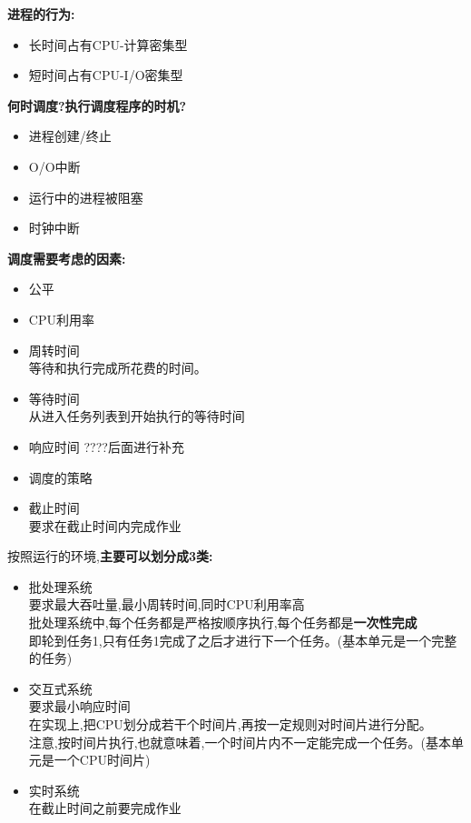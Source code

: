 \documentclass[UTF8,a4paper]{ctexart}
\newcommand{\spaceline}{\vspace{\baselineskip}}
\begin{document}
    \spaceline
    \textbf{进程的行为:}
    \begin{itemize}
      \item 长时间占有CPU-计算密集型
      \item 短时间占有CPU-I/O密集型
    \end{itemize}

    \spaceline
    \textbf{何时调度?执行调度程序的时机?}
    \begin{itemize}
      \item 进程创建/终止
      \item O/O中断
      \item 运行中的进程被阻塞
      \item 时钟中断
    \end{itemize}

    \spaceline
    \textbf{调度需要考虑的因素:}
    \begin{itemize}
      \item 公平
      \item CPU利用率
      \item 周转时间\\
      等待和执行完成所花费的时间。
      \item 等待时间\\
      从进入任务列表到开始执行的等待时间
      \item 响应时间{\color{red} ????后面进行补充}
      \item 调度的策略
      \item 截止时间\\要求在截止时间内完成作业
    \end{itemize}

    \spaceline
    按照运行的环境,\textbf{主要可以划分成3类:}
    \begin{itemize}
      \item 批处理系统\\
      要求最大吞吐量,最小周转时间,同时CPU利用率高\\
      批处理系统中,每个任务都是严格按顺序执行,每个任务都是\textbf{一次性完成}\\
      即轮到任务1,只有任务1完成了之后才进行下一个任务。(基本单元是一个完整的任务)
      \item 交互式系统\\
      要求最小响应时间\\
      在实现上,把CPU划分成若干个时间片,再按一定规则对时间片进行分配。\\
      注意,按时间片执行,也就意味着,一个时间片内不一定能完成一个任务。(基本单元是一个CPU时间片)
      \item 实时系统\\
      在截止时间之前要完成作业
    \end{itemize}
\end{document}

